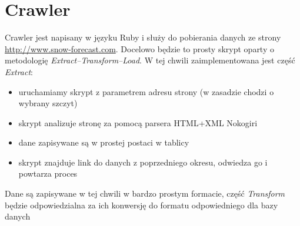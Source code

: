 \documentclass[12pt]{article}
\begin{document}
\section{Crawler}
Crawler jest napisany w języku Ruby i służy do pobierania danych ze strony
\\\url{http://www.snow-forecast.com}.
Docelowo będzie to prosty skrypt oparty o metodologię \emph{Extract--Transform--Load}. W tej chwili zaimplementowana
jest część \emph{Extract}:
\begin{itemize}
\item uruchamiamy skrypt z parametrem adresu strony (w zasadzie chodzi o wybrany szczyt)
\item skrypt analizuje stronę za pomocą parsera HTML+XML Nokogiri
\item dane zapisywane są w prostej postaci w tablicy
\item skrypt znajduje link do danych z poprzedniego okresu, odwiedza go i powtarza proces
\end{itemize}

Dane są zapisywane w tej chwili w bardzo prostym formacie, część \emph{Transform} będzie odpowiedzialna
za ich konwersję do formatu odpowiedniego dla bazy danych
\newpage
\end{document}
